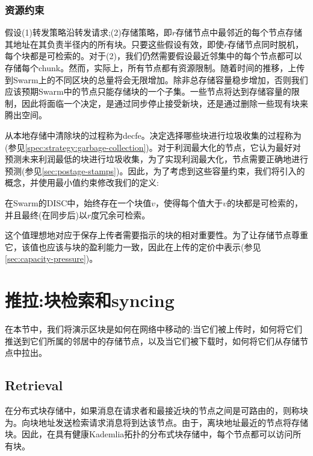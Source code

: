 \subsubsection{资源约束}

假设(1)转发策略沿转发请求;(2)存储策略，即$r$存储节点中最邻近的每个节点存储其地址在其负责半径内的所有块。只要这些假设有效，即使$r$存储节点同时脱机，每个块都是可检索的。对于(2)，我们仍然需要假设最近邻集中的每个节点都可以存储每个chunk。然而，实际上，所有节点都有资源限制。随着时间的推移，上传到Swarm上的不同区块的总量将会无限增加。除非总存储容量稳步增加，否则我们应该预期Swarm中的节点只能存储块的一个子集。一些节点将达到存储容量的限制，因此将面临一个决定，是通过同步停止接受新块，还是通过删除一些现有块来腾出空间。

从本地存储中清除块的过程称为decfe。决定选择哪些块进行垃圾收集的过程称为(参见\ref{spec:strategy:garbage-collection})。对于利润最大化的节点，它认为最好对预测未来利润最低的块进行垃圾收集，为了实现利润最大化，节点需要正确地进行预测(参见\ref{sec:postage-stamps})。因此，为了考虑到这些容量约束，我们将引入的概念，并使用最小值约束修改我们的定义:

在Swarm的DISC中，始终存在一个块值$v$，使得每个值大于$v$的块都是可检索的，并且最终(在同步后)以$r$度冗余可检索。

这个值理想地对应于保存上传者需要指示的块的相对重要性。为了让存储节点尊重它，该值也应该与块的盈利能力一致，因此在上传的定价中表示(参见\ref{sec:capacity-pressure})。


\section{推拉:块检索和syncing\statusgreen}\label{sec:push-and-pull}
\green{}
在本节中，我们将演示区块是如何在网络中移动的:当它们被上传时，如何将它们推送到它们所属的邻居中的存储节点，以及当它们被下载时，如何将它们从存储节点中拉出。

\subsection{Retrieval\statusgreen}\label{sec:retrieval}

在分布式块存储中，如果消息在请求者和最接近块的节点之间是可路由的，则称块为。向块地址发送检索请求消息将到达该节点。由于，离块地址最近的节点将存储块。因此，在具有健康Kademlia拓扑的分布式块存储中，每个节点都可以访问所有块。

